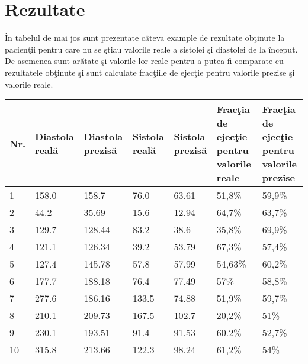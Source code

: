 \section{Rezultate}

\^{I}n tabelul de mai jos sunt prezentate c\^{a}teva example de rezultate ob\c{t}inute la pacien\c{t}ii pentru care nu se \c{s}tiau valorile reale a sistolei \c{s}i diastolei de la \^{i}nceput. De asemenea sunt ar\u{a}tate \c{s}i valorile lor reale pentru a putea fi comparate cu rezultatele ob\c{t}inute \c{s}i sunt calculate frac\c{t}iile de ejec\c{t}ie pentru valorile prezise \c{s}i valorile reale.

\begin{center}
 \begin{longtable}{|p{0.5cm}|p{2cm}|p{2cm}|p{2cm}|p{2cm}|p{2cm}|p{2cm}|} 
 \hline
 Nr. & Diastola real\u{a} & Diastola prezis\u{a} & Sistola real\u{a} & Sistola prezis\u{a} & Frac\c{t}ia de ejec\c{t}ie pentru valorile reale & Frac\c{t}ia de ejec\c{t}ie pentru valorile prezise  \\ [0.5ex] 
 \hline\hline
 1 &  158.0 & 158.7 & 76.0 & 63.61 & 51,8\% & 59,9\% \\
 \hline
 2 &  44.2 & 35.69 & 15.6 & 12.94 & 64,7\% & 63,7\% \\ 
 \hline
 3 &  129.7 & 128.44 & 83.2 & 38.6 & 35,8\% & 69,9\% \\
 \hline
 4 &  121.1 & 126.34 & 39.2 & 53.79 & 67,3\% & 57,4\% \\
 \hline
 5 &  127.4 & 145.78 & 57.8 & 57.99 & 54,63\% & 60,2\% \\
 \hline
 6 &  177.7 & 188.18 & 76.4 & 77.49 & 57\% & 58,8\% \\
 \hline
 7 &  277.6 & 186.16 & 133.5 & 74.88 & 51,9\% & 59,7\% \\
 \hline
 8 &  210.1 & 209.73 & 167.5 & 102.7 & 20,2\% & 51\% \\
 \hline
 9 &  230.1 & 193.51 & 91.4 & 91.53 & 60.2\% & 52,7\% \\
 \hline
 10 &  315.8 & 213.66 & 122.3 & 98.24 & 61,2\% & 54\% \\
 \hline
\end{longtable}
\end{center}

